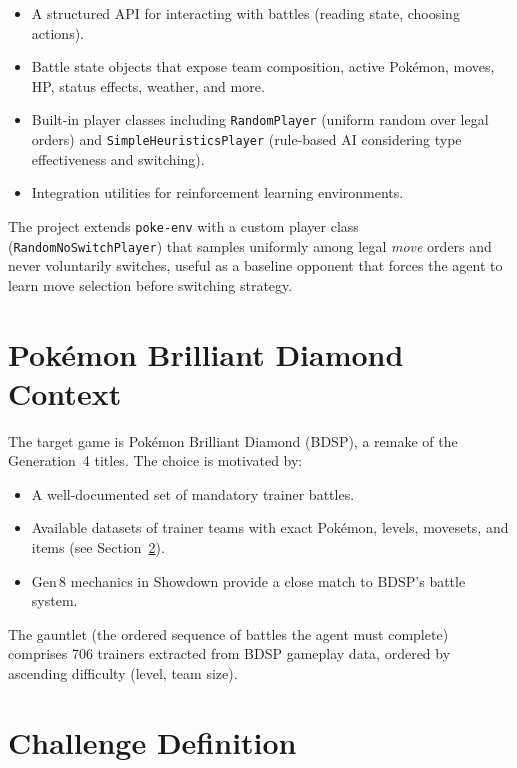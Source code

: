 \begin{itemize}
  \item A structured API for interacting with battles (reading state,
        choosing actions).
  \item Battle state objects that expose team composition, active Pok\'{e}mon,
        moves, HP, status effects, weather, and more.
  \item Built-in player classes including \texttt{RandomPlayer} (uniform
        random over legal orders) and \texttt{SimpleHeuristicsPlayer}
        (rule-based AI considering type effectiveness and switching).
  \item Integration utilities for reinforcement learning environments.
\end{itemize}

The project extends \texttt{poke-env} with a custom player class
(\texttt{RandomNoSwitchPlayer}) that samples uniformly among legal \emph{move}
orders and never voluntarily switches, useful as a baseline opponent that
forces the agent to learn move selection before switching strategy.

\section{Pok\'{e}mon Brilliant Diamond Context}

The target game is Pok\'{e}mon Brilliant Diamond (BDSP), a remake of the
Generation~4 titles.  The choice is motivated by:

\begin{itemize}
  \item A well-documented set of mandatory trainer battles.
  \item Available datasets of trainer teams with exact Pok\'{e}mon, levels,
        movesets, and items (see Section~\ref{sec:challenge}).
  \item Gen\,8 mechanics in Showdown provide a close match to BDSP's battle
        system.
\end{itemize}

The gauntlet (the ordered sequence of battles the agent must
complete) comprises 706 trainers extracted from BDSP gameplay data, ordered
by ascending difficulty (level, team size).

\section{Challenge Definition}
\label{sec:challenge}

